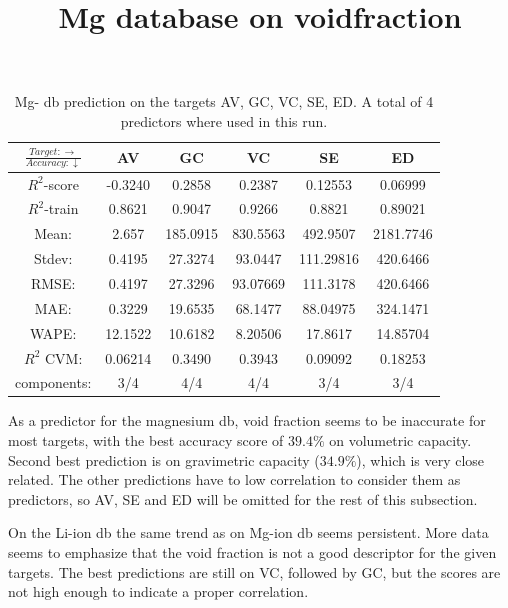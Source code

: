 \begin{table}[H]
\scriptsize
\centering
\caption{Mg- db prediction on the targets AV, GC, VC, SE, ED. A total of 4 predictors where used in this run.}
\title{Mg database on voidfraction}
\begin{tabular}{|c|c|c|c|c|c|}
	\hline 
	$\frac{Target: \rightarrow}{Accuracy:\downarrow} $ & AV & GC & VC & SE & ED 
	 \\ 
	\hline
	$R^2$-score & -0.3240 & 0.2858 & 0.2387 & 0.12553 &  0.06999\\ 
	\hline 
	$R^2$-train & 0.8621 &  0.9047 & 0.9266 & 0.8821 & 0.89021 \\ 
	\hline
	Mean: 	& 2.657	&185.0915&830.5563& 492.9507	&2181.7746\\
	\hline 
	Stdev:	&0.4195	&27.3274	&93.0447&111.29816	&420.6466\\
	\hline 
	RMSE:	 &0.4197& 27.3296 &  93.07669 & 111.3178 & 420.6466 \\ 
	\hline
	MAE: 	& 0.3229 & 19.6535& 68.1477 & 88.04975 & 324.1471 \\ 
	\hline
	WAPE: 	& 12.1522 & 10.6182 & 8.20506  & 17.8617 & 14.85704 \\
	\hline
	$R^2$ CVM: & 0.06214 &  0.3490 & 0.3943  & 0.09092 & 0.18253 \\
	\hline
	components: & 3/4 	& 4/4 	& 4/4 	 & 3/4	 & 3/4 \\
	\hline
\end{tabular}
\label{tab:mg-n-ii}
\end{table}

As a predictor for the magnesium db, void fraction seems to be inaccurate for most targets, with the best accuracy score of $39.4\%$ on volumetric capacity. Second best prediction is on gravimetric capacity ($34.9\%$), which is very close related. The other predictions have to low correlation to consider them as predictors, so AV, SE and ED will be omitted for the rest of this subsection.



On the Li-ion db the same trend as on Mg-ion db seems persistent. More data seems to emphasize that the void fraction is not a good descriptor for the given targets. The best predictions are still on VC, followed by GC, but the scores are not high enough to indicate a proper correlation. 

